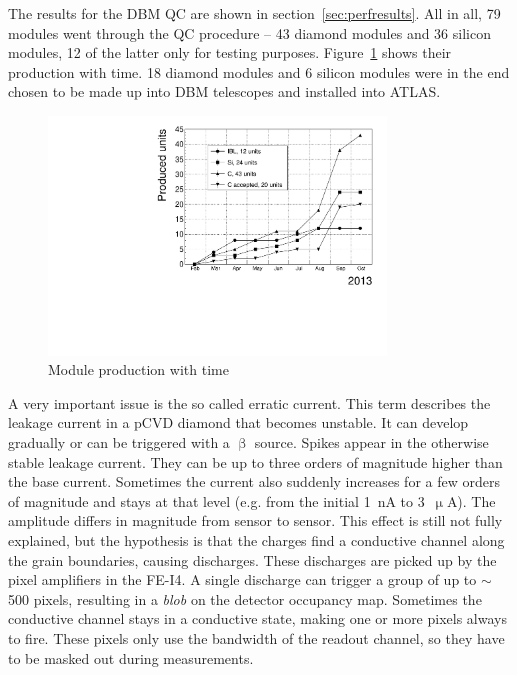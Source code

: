 The results for the DBM QC are shown in section~\ref{sec:perfresults}.  All in all, 79 modules went through the QC procedure -- 43 diamond modules and 36 silicon modules, 12 of the latter only for testing purposes. Figure~\ref{fig:production} shows their production with time. 18 diamond modules and 6 silicon modules were in the end chosen to be made up into DBM telescopes and installed into ATLAS.
\begin{figure}[!t]
\centering
\includegraphics[width=0.8\textwidth]{../scripts/04_charge_monitoring/plots/production}
\caption{Module production with time}
\label{fig:production}
\end{figure}

A very important issue is the so called erratic current. This term describes the leakage current in a pCVD diamond that becomes unstable. It can develop gradually or can be triggered with a $\upbeta$ source. Spikes appear in the otherwise stable leakage current. They can be up to three orders of magnitude higher than the base current. Sometimes the current also suddenly increases for a few orders of magnitude and stays at that level (e.g. from the initial 1~nA to 3~$\upmu$A). The amplitude differs in magnitude from sensor to sensor. This effect is still not fully explained, but the hypothesis is that the charges find a conductive channel along the grain boundaries, causing discharges. These discharges are picked up by the pixel amplifiers in the FE-I4. A single discharge can trigger a group of up to $\sim$500 pixels, resulting in a \emph{blob} on the detector occupancy map. Sometimes the conductive channel stays in a conductive state, making one or more pixels always to fire. These pixels only use the bandwidth of the readout channel, so they have to be masked out during measurements. 

